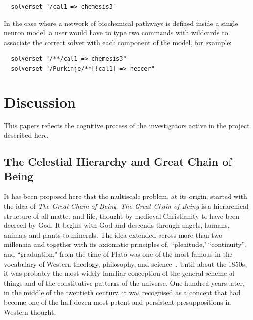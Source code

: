 \documentclass[11pt,3p,twocolumn]{JMN}
\begin{document}
\begin{tiny}
\begin{verbatim}
  solverset "/cal1 => chemesis3"
\end{verbatim}
\end{tiny}

In the case where a network of biochemical pathways is defined inside a single neuron model, a user would have to type two commands with wildcards to associate the correct solver with each component of the model, for example:

\begin{tiny}
\begin{verbatim}
  solverset "/**/cal1 => chemesis3"
  solverset "/Purkinje/**[!cal1] => heccer"
\end{verbatim}
\end{tiny}


\section{Discussion}

This papers reflects the cognitive process of the investigators active in the project described here.

\subsection{The Celestial Hierarchy and Great Chain of Being}
It has been proposed here that the multiscale problem, at its origin, started with the idea of {\it The Great Chain of Being}. {\it The Great Chain of Being} is a hierarchical structure of all matter and life, thought by medieval Christianity to have been decreed by God. It begins with God and descends through angels, humans, animals and plants to minerals. The idea extended across more than two millennia and together with its axiomatic principles of, ``plenitude,' ``continuity'', and ``graduation," from the time of Plato was one of the most famous in the vocabulary of Western theology, philosophy, and science~\citep{lovejoy48}. Until about the 1850s, it was probably the most widely familiar conception of the general scheme of things and of the constitutive patterns of the universe. One hundred years later, in the middle of the twentieth century, it was recognised as a concept that had become one of the half-dozen most potent and persistent presuppositions in Western thought.
\end{document}
